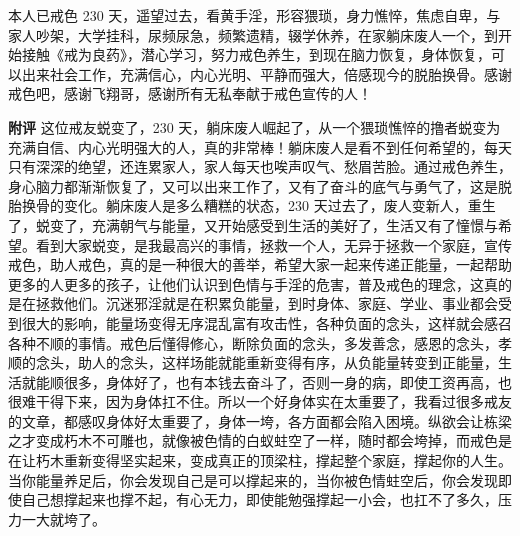 \begin{case}
    本人已戒色 230 天，遥望过去，看黄手淫，形容猥琐，身力憔悴，焦虑自卑，与家人吵架，大学挂科，尿频尿急，频繁遗精，辍学休养，在家躺床废人一个，到开始接触《戒为良药》，潜心学习，努力戒色养生，到现在脑力恢复，身体恢复，可以出来社会工作，充满信心，内心光明、平静而强大，倍感现今的脱胎换骨。感谢戒色吧，感谢飞翔哥，感谢所有无私奉献于戒色宣传的人！

    \textbf{附评} 这位戒友蜕变了，230 天，躺床废人崛起了，从一个猥琐憔悴的撸者蜕变为充满自信、内心光明强大的人，真的非常棒！躺床废人是看不到任何希望的，每天只有深深的绝望，还连累家人，家人每天也唉声叹气、愁眉苦脸。通过戒色养生，身心脑力都渐渐恢复了，又可以出来工作了，又有了奋斗的底气与勇气了，这是脱胎换骨的变化。躺床废人是多么糟糕的状态，230 天过去了，废人变新人，重生了，蜕变了，充满朝气与能量，又开始感受到生活的美好了，生活又有了憧憬与希望。看到大家蜕变，是我最高兴的事情，拯救一个人，无异于拯救一个家庭，宣传戒色，助人戒色，真的是一种很大的善举，希望大家一起来传递正能量，一起帮助更多的人更多的孩子，让他们认识到色情与手淫的危害，普及戒色的理念，这真的是在拯救他们。沉迷邪淫就是在积累负能量，到时身体、家庭、学业、事业都会受到很大的影响，能量场变得无序混乱富有攻击性，各种负面的念头，这样就会感召各种不顺的事情。戒色后懂得修心，断除负面的念头，多发善念，感恩的念头，孝顺的念头，助人的念头，这样场能就能重新变得有序，从负能量转变到正能量，生活就能顺很多，身体好了，也有本钱去奋斗了，否则一身的病，即使工资再高，也很难干得下来，因为身体扛不住。所以一个好身体实在太重要了，我看过很多戒友的文章，都感叹身体好太重要了，身体一垮，各方面都会陷入困境。纵欲会让栋梁之才变成朽木不可雕也，就像被色情的白蚁蛀空了一样，随时都会垮掉，而戒色是在让朽木重新变得坚实起来，变成真正的顶梁柱，撑起整个家庭，撑起你的人生。当你能量养足后，你会发现自己是可以撑起来的，当你被色情蛀空后，你会发现即使自己想撑起来也撑不起，有心无力，即使能勉强撑起一小会，也扛不了多久，压力一大就垮了。
\end{case}

